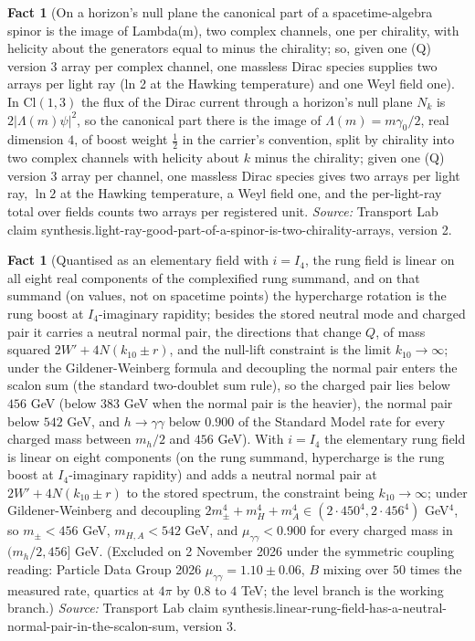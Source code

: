 \documentclass[11pt]{article}
\theoremstyle{definition}
\newtheorem{fact}[theorem]{Fact}
\theoremstyle{plain}
\providecommand{\Cl}{}\renewcommand{\Cl}{\mathrm{Cl}}
\begin{document}
\begin{fact}[On a horizon's null plane the canonical part of a spacetime-algebra spinor is the image of Lambda(m), two complex channels, one per chirality, with helicity about the generators equal to minus the chirality; so, given one (Q) version 3 array per complex channel, one massless Dirac species supplies two arrays per light ray (ln 2 at the Hawking temperature) and one Weyl field one]\label{c:synthesis.light-ray-good-part-of-a-spinor-is-two-chirality-arrays}
In $\Cl(1,3)$ the flux of the Dirac current through a horizon's null plane $N_{k}$ is $2|\Lambda(m)\psi|^{2}$, so the canonical part there is the image of $\Lambda(m) = m\gamma_{0}/2$, real dimension $4$, of boost weight $\tfrac12$ in the carrier's convention, split by chirality into two complex channels with helicity about $k$ minus the chirality; given one (Q) version 3 array per channel, one massless Dirac species gives two arrays per light ray, $\ln 2$ at the Hawking temperature, a Weyl field one, and the per-light-ray total over fields counts two arrays per registered unit.
\emph{Source:} Transport Lab claim synthesis.light-ray-good-part-of-a-spinor-is-two-chirality-arrays, version 2.
\end{fact}

\begin{fact}[Quantised as an elementary field with $i = I_{4}$, the rung field is linear on all eight real components of the complexified rung summand, and on that summand (on values, not on spacetime points) the hypercharge rotation is the rung boost at $I_{4}$-imaginary rapidity; besides the stored neutral mode and charged pair it carries a neutral normal pair, the directions that change $Q$, of mass squared $2W' + 4N(k_{10} \pm r)$, and the null-lift constraint is the limit $k_{10} \to \infty$; under the Gildener-Weinberg formula and decoupling the normal pair enters the scalon sum (the standard two-doublet sum rule), so the charged pair lies below $456$ GeV (below $383$ GeV when the normal pair is the heavier), the normal pair below $542$ GeV, and $h \to \gamma\gamma$ below $0.900$ of the Standard Model rate for every charged mass between $m_{h}/2$ and $456$ GeV]\label{c:synthesis.linear-rung-field-has-a-neutral-normal-pair-in-the-scalon-sum}
With $i = I_{4}$ the elementary rung field is linear on eight components (on the rung summand, hypercharge is the rung boost at $I_{4}$-imaginary rapidity) and adds a neutral normal pair at $2W' + 4N(k_{10} \pm r)$ to the stored spectrum, the constraint being $k_{10} \to \infty$; under Gildener-Weinberg and decoupling $2m_{\pm}^{4} + m_{H}^{4} + m_{A}^{4} \in (2 \cdot 450^{4}, 2 \cdot 456^{4})$ GeV$^{4}$, so $m_{\pm} < 456$ GeV, $m_{H,A} < 542$ GeV, and $\mu_{\gamma\gamma} < 0.900$ for every charged mass in $(m_{h}/2, 456]$ GeV. (Excluded on 2 November 2026 under the symmetric coupling reading: Particle Data Group 2026 $\mu_{\gamma\gamma} = 1.10 \pm 0.06$, $B$ mixing over $50$ times the measured rate, quartics at $4\pi$ by $0.8$ to $4$ TeV; the level branch is the working branch.)
\emph{Source:} Transport Lab claim synthesis.linear-rung-field-has-a-neutral-normal-pair-in-the-scalon-sum, version 3.
\end{fact}
\end{document}
